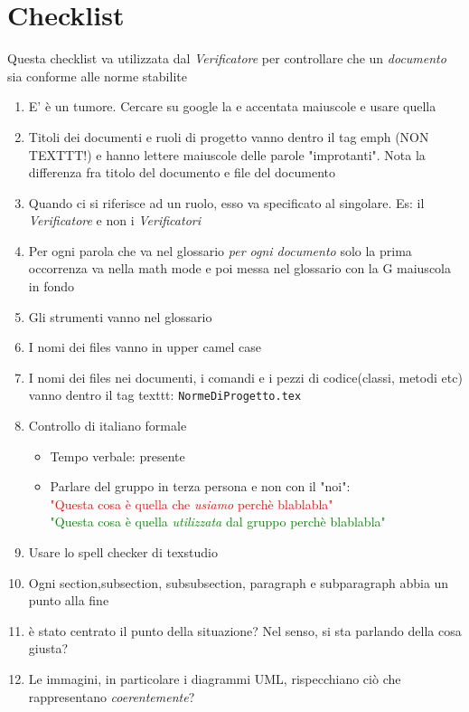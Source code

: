 \section{Checklist}
Questa checklist va utilizzata dal \emph{Verificatore} per controllare che un \emph{documento} sia conforme alle norme stabilite

\begin{enumerate}
	\item E' è un tumore. Cercare su google la e accentata maiuscole e usare quella
	\item Titoli dei documenti e ruoli di progetto vanno dentro il tag emph (NON TEXTTT!) e hanno lettere maiuscole delle parole "improtanti". Nota la differenza fra titolo del documento e file del documento
	\item Quando ci si riferisce ad un ruolo, esso va specificato al singolare. Es: il \emph{Verificatore} e non i \emph{Verificatori}
	\item Per ogni parola che va nel glossario \emph{per ogni documento} solo la prima occorrenza va nella math mode e poi messa nel glossario con la G maiuscola in fondo
	\item Gli strumenti vanno nel glossario
	\item I nomi dei files vanno in upper camel case
	\item I nomi dei files nei documenti, i comandi e i pezzi di codice(classi, metodi etc) vanno dentro il tag texttt: \texttt{NormeDiProgetto.tex}
	\item Controllo di italiano formale
	\begin{itemize}
		\item Tempo verbale: presente
		\item Parlare del gruppo in terza persona e non con il "noi":\\ \textcolor{red}{"Questa cosa è quella che \emph{usiamo} perchè blablabla"}\\
		\textcolor{green}{"Questa cosa è quella \emph{utilizzata} dal gruppo perchè blablabla"}
	\end{itemize}
	\item Usare lo spell checker di texstudio
	\item Ogni section,subsection, subsubsection, paragraph e subparagraph abbia un punto alla fine
	\item è stato centrato il punto della situazione? Nel senso, si sta parlando della cosa giusta?
	\item Le immagini, in particolare i diagrammi UML, rispecchiano ciò che rappresentano \emph{coerentemente}?
\end{enumerate}